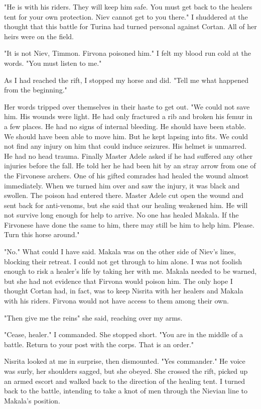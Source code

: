 \documentclass{article}
\begin{document}
"He is with his riders. They will keep him safe. You must get back to the healers tent for your own protection. Niev cannot get to you there." I shuddered at the thought that this battle for Turina had turned personal against Cortan. All of her heirs were on the field. 

"It is not Niev, Timmon. Firvona poisoned him." I felt my blood run cold at the words. "You must listen to me."

As I had reached the rift, I stopped my horse and did. "Tell me what happened from the beginning."

Her words tripped over themselves in their haste to get out. "We could not save him. His wounds were light. He had only fractured a rib and broken his femur in a few places. He had no signs of internal bleeding. He should have been stable. We should have been able to move him. But he kept lapsing into fits. We could not find any injury on him that could induce seizures. His helmet is unmarred. He had no head trauma. Finally Master Adele asked if he had suffered any other injuries before the fall. He told her he had  been hit by an stray arrow from one of the Firvonese archers. One of his gifted comrades had healed the wound almost immediately. When we turned him over and saw the injury, it was black and swollen. The poison had entered there. Master Adele cut open the wound and sent back for anti-venoms, but she said that our healing weakened him. He will not survive long enough for help to arrive. No one has healed Makala. If the Firvonese have done the same to him, there may still be him to help him. Please. Turn this horse around."

"No." What could I have said. Makala was on the other side of Niev's lines, blocking their retreat. I could not get through to him alone. I was not foolish enough to risk a healer's life by taking her with me. Makala needed to be warned, but she had not evidence that Firvona would poison him. The only hope I thought Cortan had, in fact, was to keep Nisrita with her healers and Makala with his riders. Firvona would not have access to them among their own. 

"Then give me the reins" she said, reaching over my arms.

"Cease, healer." I commanded. She stopped short. "You are in the middle of a battle. Return to your post with the corps. That is an order."

Nisrita looked at me in surprise, then dismounted. "Yes commander." He voice was surly, her shoulders sagged, but she obeyed. She crossed the rift, picked up an armed escort and walked back to the direction of the healing tent. I turned back to the battle, intending to take a knot of men through the Nievian line to Makala's position. 
\end{document}
